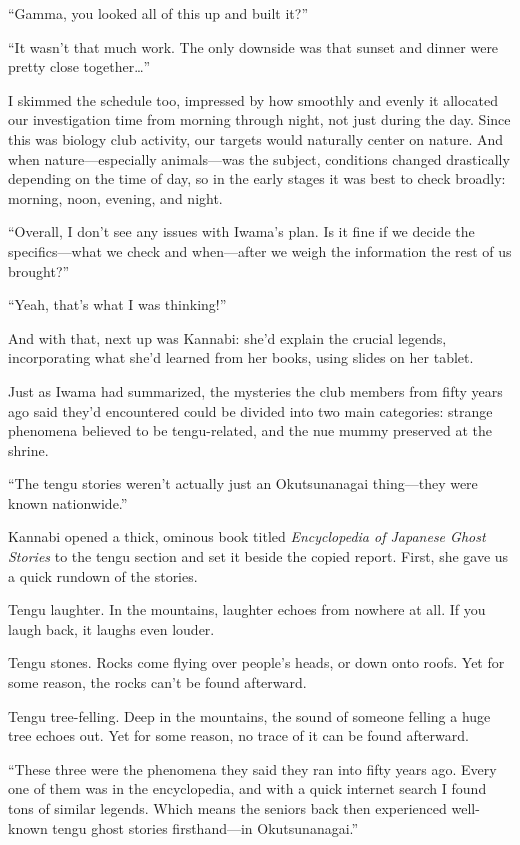 \documentclass[
    a4paper,
    12pt,
    twoside,
    openany,
    UTF8,
    fontset=windows
]{ctexbook}
\begin{document}
``Gamma, you looked all of this up and built it?''

``It wasn't that much work. The only downside was that sunset and dinner were pretty close together\dots''

I skimmed the schedule too, impressed by how smoothly and evenly it allocated our investigation time from morning through night, not just during the day. Since this was biology club activity, our targets would naturally center on nature. And when nature---especially animals---was the subject, conditions changed drastically depending on the time of day, so in the early stages it was best to check broadly: morning, noon, evening, and night.

``Overall, I don't see any issues with Iwama's plan. Is it fine if we decide the specifics---what we check and when---after we weigh the information the rest of us brought?''

``Yeah, that's what I was thinking!''

And with that, next up was Kannabi: she'd explain the crucial legends, incorporating what she'd learned from her books, using slides on her tablet.

Just as Iwama had summarized, the mysteries the club members from fifty years ago said they'd encountered could be divided into two main categories: strange phenomena believed to be tengu-related, and the nue mummy preserved at the shrine.

``The tengu stories weren't actually just an Okutsunanagai thing---they were known nationwide.''

Kannabi opened a thick, ominous book titled \textit{Encyclopedia of Japanese Ghost Stories} to the tengu section and set it beside the copied report. First, she gave us a quick rundown of the stories.

Tengu laughter. In the mountains, laughter echoes from nowhere at all. If you laugh back, it laughs even louder.

Tengu stones. Rocks come flying over people's heads, or down onto roofs. Yet for some reason, the rocks can't be found afterward.

Tengu tree-felling. Deep in the mountains, the sound of someone felling a huge tree echoes out. Yet for some reason, no trace of it can be found afterward.

``These three were the phenomena they said they ran into fifty years ago. Every one of them was in the encyclopedia, and with a quick internet search I found tons of similar legends. Which means the seniors back then experienced well-known tengu ghost stories firsthand---in Okutsunanagai.''
\end{document}
